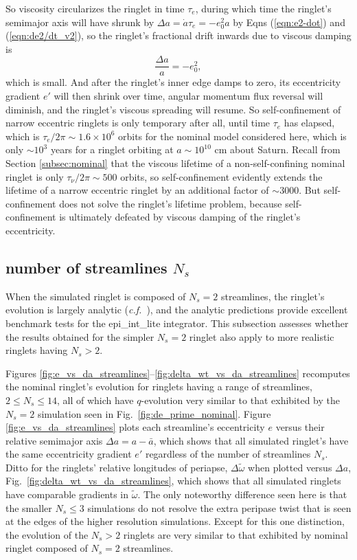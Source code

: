 \documentclass[preprint]{aastex62}
\begin{document}
So viscosity circularizes the ringlet in time $\tau_e$, during which time the ringlet's
semimajor axis will have shrunk by $\Delta a=\dot{a}\tau_e=-e_0^2a$ by Eqns (\ref{eqn:e2-dot})
and (\ref{eqn:de2/dt_v2}), so the ringlet's
fractional drift inwards due to viscous damping is
\begin{equation}
    \label{eqn:delta-a}
    \frac{\Delta a}{a} = -e_0^2,
\end{equation}
which is small. And after the ringlet's inner edge damps to zero, its eccentricity gradient $e'$
will then shrink over time, angular momentum flux reversal will diminish, and the ringlet's 
viscous spreading will resume. So self-confinement of narrow eccentric ringlets is only temporary
after all, until time $\tau_e$ has elapsed, which is $\tau_e/2\pi\sim1.6\times10^6$ orbits for 
the nominal model considered here, which is only $\sim10^3$ years for a ringlet orbiting at 
$a\sim10^{10}$ cm about Saturn. Recall from Section \ref{subsec:nominal}
that the viscous lifetime of a non-self-confining
nominal ringlet is only $\tau_\nu/2\pi\sim500$ orbits, so self-confinement evidently
extends the lifetime of a narrow eccentric ringlet by an additional 
factor of $\sim3000$. But self-confinement
does not solve the ringlet's lifetime problem, because self-confinement is ultimately
defeated by viscous damping of the ringlet's eccentricity.


\subsection{number of streamlines $N_s$}
\label{subsec:num_streamlines}

When the simulated ringlet is composed of $N_s=2$ streamlines, the ringlet's
evolution is largely analytic ({\it c.f.}\ \citealt{BGT82, BGT83}), and the analytic
predictions provide excellent benchmark tests for the epi\_int\_lite integrator. This subsection 
assesses whether the results obtained for the simpler $N_s=2$ ringlet also apply to
more realistic ringlets having $N_s>2$.

Figures \ref{fig:e_vs_da_streamlines}--\ref{fig:delta_wt_vs_da_streamlines} recomputes the nominal
ringlet's evolution for ringlets having a range of streamlines, $2\le N_s\le14$, all of which
have $q$-evolution very similar to that exhibited by the $N_s=2$ simulation seen in 
Fig.\ \ref{fig:de_prime_nominal}.  Figure \ref{fig:e_vs_da_streamlines} 
plots each streamline's eccentricity $e$
versus their relative semimajor axis $\Delta a=a-\bar{a}$, which shows that
all simulated ringlet's have the same eccentricity gradient $e'$ regardless
of the number of streamlines $N_s$.
Ditto for the ringlets' relative longitudes of periapse, $\Delta\tilde{\omega}$ when
plotted versus $\Delta a$, Fig.\ \ref{fig:delta_wt_vs_da_streamlines},
which shows that all simulated ringlets have comparable gradients in $\tilde{\omega}$.
The only noteworthy difference seen here is that the smaller $N_s\le 3$ simulations
do not resolve the extra peripase twist that is seen at the edges of the higher resolution simulations.
Except for this one distinction,
the evolution of the $N_s>2$ ringlets are very similar to that exhibited by nominal
ringlet composed of $N_s=2$ streamlines.
\end{document}
